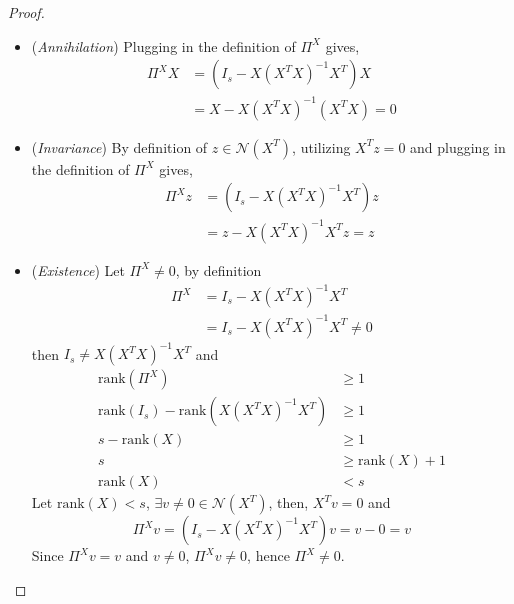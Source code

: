 \documentclass[pdflatex,sn-mathphys-num]{sn-jnl}%
\theoremstyle{thmstyleone}%
\theoremstyle{thmstyletwo}%
\theoremstyle{thmstylethree}%
\begin{document}
    \begin{proof}
        \begin{itemize}
        \item (\textit{Annihilation}) 
        Plugging in the definition of $\Pi^X$ gives,
        \begin{equation*}
        \begin{split}
            \Pi^X X&=(I_s-X{(X^T X)}^{-1}X^T) X\\
            &=X-X{(X^T X)}^{-1}{(X^T X)}=0
        \end{split}
        \end{equation*}
        \item (\textit{Invariance})
        By definition of $z\in\mathcal{N}(X^T)$, utilizing $X^T z=0$ and plugging in the definition of $\Pi^X$ gives,
        \begin{equation*}
        \begin{split}
            \Pi^X z&=(I_s-X{(X^T X)}^{-1}X^T) z\\
            &=z-X{(X^T X)}^{-1}X^T z=z
        \end{split}
        \end{equation*}
        \item (\textit{Existence})
        Let $\Pi^X\neq 0$, by definition 
        \begin{equation*}
        \begin{split}
            \Pi^X &=I_s-X{(X^T X)}^{-1}X^T \\
            &=I_s-X{(X^T X)}^{-1}X^T\neq 0
        \end{split}
        \end{equation*}
        then $I_s\neq X{(X^T X)}^{-1}X^T$ and 
        \begin{equation*}
        \begin{split}
            \mathrm{rank}(\Pi^X) &\geq 1 \\
            \mathrm{rank}(I_s)-\mathrm{rank}(X{(X^T X)}^{-1}X^T)&\geq 1 \\
            s-\mathrm{rank}(X)&\geq 1\\
            s&\geq \mathrm{rank}(X)+1\\
            \mathrm{rank}(X)&<s
        \end{split}
        \end{equation*}
        Let $\mathrm{rank}(X)<s$, $\exists v\neq 0\in\mathcal{N}(X^T)$, then, $X^T v=0$ and
        \begin{equation*}
            \Pi^X v=(I_s-X{(X^T X)}^{-1}X^T)v=v-0=v
        \end{equation*}
        Since $\Pi^X v=v$ and $v\neq 0$, $\Pi^X v\neq 0$, hence $\Pi^X\neq 0$.
    \end{itemize}
\end{proof}
\end{document}

